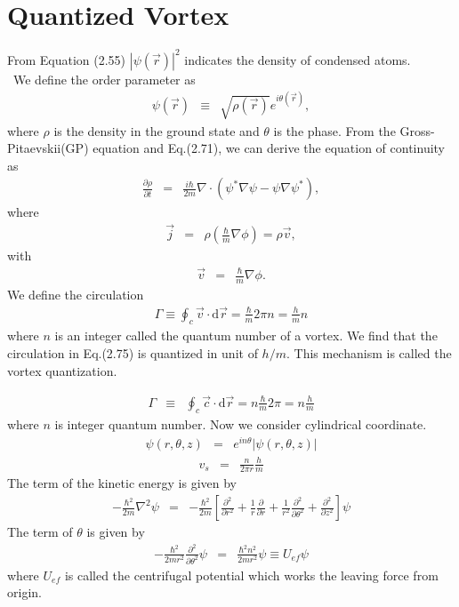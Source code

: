 \documentclass[12pt,a4paper]{report} %
\newcommand{\diff}{\mathrm{d}}				%
\begin{document}
\section{Quantized Vortex}
From Equation (2.55) $|\psi(\vec{r})|^2$ indicates the density of condensed atoms.
\\
\ We define the order parameter as
\begin{eqnarray}
\psi( \vec{r} ) & \equiv & \sqrt{\rho(\vec{r})} e^{i \theta(\vec{r})},
\end{eqnarray}
where $\rho$ is the density in the ground state and $\theta$ is the phase.
From the Gross-Pitaevskii(GP) equation and Eq.(2.71), we can derive the equation of continuity as
\begin{eqnarray}
\frac{\partial \rho}{\partial t} & = & \frac{i \hbar}{2m} \nabla \cdot ( \psi^* \nabla \psi - \psi \nabla \psi^* ),
\end{eqnarray}
where
\begin{eqnarray}
\vec{j} & = &  \rho \left( \frac{\hbar}{m} \nabla \phi \right) = \rho \vec{v},
\end{eqnarray}
with
\begin{eqnarray}
\vec{v} & = & \frac{\hbar}{m} \nabla \phi.
\end{eqnarray}
We define the circulation
\begin{eqnarray}
\Gamma \equiv \oint_c \vec{v} \cdot \diff \vec{r} = \frac{\hbar}{m} 2 \pi n = \frac{h}{m} n
\end{eqnarray}
where $n$ is an integer called the  quantum number of a vortex. 
We find that the circulation in Eq.(2.75) is quantized in unit of $h/m$.
This mechanism is called the vortex quantization.

\begin{eqnarray}
\Gamma & \equiv & \oint_c \vec{c} \cdot \diff \vec{r} = n \frac{\hbar}{m} 2 \pi = n \frac{h}{m}
\end{eqnarray}
where $n$ is integer quantum number.
Now we consider cylindrical coordinate.
\begin{eqnarray}
\psi(r, \theta, z) & = & e^{i n \theta}|\psi(r, \theta, z)|
\end{eqnarray}
\begin{eqnarray}
v_s & = & \frac{n}{2 \pi r}\frac{h}{m}
\end{eqnarray}
The term of the kinetic energy is given by
\begin{eqnarray}
- \frac{\hbar^2}{2m} \nabla^2 \psi & = & -\frac{\hbar^2}{2m}
\left[ \frac{\partial^2}{\partial r^2} + \frac{1}{r} \frac{\partial}{\partial r}
+ \frac{1}{r^2}\frac{\partial^2}{\partial \theta^2} + \frac{\partial^2}{\partial z^2} 
\right] \psi
\end{eqnarray}
The term of $\theta$ is given by
\begin{eqnarray}
-\frac{\hbar^2}{2mr^2} \frac{\partial^2}{\partial \theta^2} \psi
& = & \frac{\hbar^2 n^2}{2mr^2} \psi \equiv U_{ef} \psi
\end{eqnarray}
where $U_{ef}$ is called the centrifugal potential which works the leaving force from origin.
\end{document}
